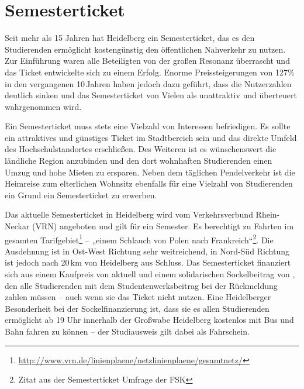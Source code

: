 
\section{Semesterticket}
Seit mehr als 15 Jahren hat Heidelberg ein Semesterticket, das es den Studierenden ermöglicht kostengünstig den öffentlichen Nahverkehr zu nutzen. Zur Einführung waren alle Beteiligten von der großen Resonanz überrascht und das Ticket entwickelte sich zu einem Erfolg. Enorme Preissteigerungen von 127\% in den vergangenen 10\,Jahren haben jedoch dazu geführt, dass die Nutzerzahlen deutlich sinken und das Semesterticket von Vielen als unattraktiv und überteuert wahrgenommen wird.

Ein Semesterticket muss stets eine Vielzahl von Interessen befriedigen. Es sollte ein attraktives und günstiges Ticket im Stadtbereich sein und das direkte Umfeld des Hochschulstandortes erschließen. Des Weiteren ist es wünschenswert die ländliche Region anzubinden und den dort wohnhaften Studierenden einen Umzug und hohe Mieten zu ersparen. Neben dem täglichen Pendelverkehr ist die Heimreise zum elterlichen Wohnsitz ebenfalls für eine Vielzahl von Studierenden ein Grund ein Semesterticket zu erwerben.

Das aktuelle Semesterticket in Heidelberg wird vom Verkehrsverbund Rhein-Neckar (VRN) angeboten und gilt für ein Semester. Es berechtigt zu Fahrten im gesamten Tarifgebiet\footnote{\url{http://www.vrn.de/linienplaene/netzlinienplaene/gesamtnetz/}} -- „einem Schlauch von Polen nach Frankreich“\footnote{Zitat aus der Semesterticket Umfrage der \gls{FSK}}. Die Ausdehnung ist in Ost-West Richtung sehr weitreichend, in Nord-Süd Richtung ist jedoch nach 20\,km von Heidelberg aus Schluss. Das Semesterticket finanziert sich aus einem Kaufpreis von aktuell  und einem solidarischen Sockelbeitrag von , den alle Studierenden mit dem Studentenwerksbeitrag bei der Rückmeldung zahlen müssen -- auch wenn sie das Ticket nicht nutzen. Eine Heidelberger Besonderheit bei der Sockelfinanzierung ist, dass sie es allen Studierenden ermöglicht ab 19 Uhr innerhalb der Großwabe Heidelberg kostenlos mit Bus und Bahn fahren zu können -- der Studiausweis gilt dabei als Fahrschein.


